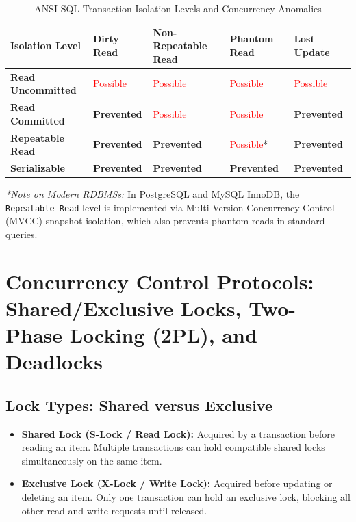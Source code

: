\begin{table}[htbp]
\centering
\caption{ANSI SQL Transaction Isolation Levels and Concurrency Anomalies}
\label{tab:isolation_levels_matrix}
\begin{tabularx}{\textwidth}{l >{\centering\arraybackslash}X >{\centering\arraybackslash}X >{\centering\arraybackslash}X >{\centering\arraybackslash}X}
\toprule
\textbf{Isolation Level} & \textbf{Dirty Read} & \textbf{Non-Repeatable Read} & \textbf{Phantom Read} & \textbf{Lost Update} \\
\midrule
\textbf{Read Uncommitted} & \textcolor{red}{Possible} & \textcolor{red}{Possible} & \textcolor{red}{Possible} & \textcolor{red}{Possible} \\
\textbf{Read Committed} & \textbf{Prevented} & \textcolor{red}{Possible} & \textcolor{red}{Possible} & \textbf{Prevented} \\
\textbf{Repeatable Read} & \textbf{Prevented} & \textbf{Prevented} & \textcolor{red}{Possible}* & \textbf{Prevented} \\
\textbf{Serializable} & \textbf{Prevented} & \textbf{Prevented} & \textbf{Prevented} & \textbf{Prevented} \\
\bottomrule
\end{tabularx}
\end{table}

\textit{*Note on Modern RDBMSs:} In PostgreSQL and MySQL InnoDB, the \texttt{Repeatable Read} level is implemented via Multi-Version Concurrency Control (MVCC) snapshot isolation, which also prevents phantom reads in standard queries.

\newpage
\section{Concurrency Control Protocols: Shared/Exclusive Locks, Two-Phase Locking (2PL), and Deadlocks}

\subsection{Lock Types: Shared versus Exclusive}

\begin{itemize}
\item \textbf{Shared Lock (S-Lock / Read Lock):} Acquired by a transaction before reading an item. Multiple transactions can hold compatible shared locks simultaneously on the same item.
\item \textbf{Exclusive Lock (X-Lock / Write Lock):} Acquired before updating or deleting an item. Only one transaction can hold an exclusive lock, blocking all other read and write requests until released.
\end{itemize}

